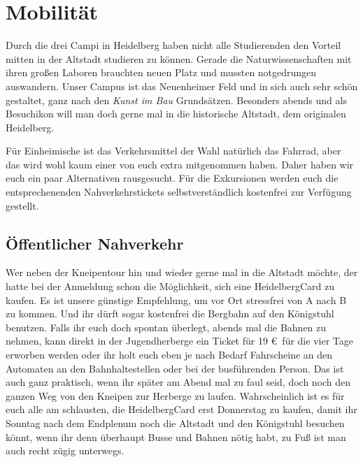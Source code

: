 
\section{Mobilität}
Durch die drei Campi in Heidelberg haben nicht alle Studierenden den Vorteil mitten in der Altstadt studieren zu können. Gerade die Naturwissenschaften mit ihren großen Laboren brauchten neuen Platz und mussten notgedrungen \glqq auswandern\grqq. Unser Campus ist das Neuenheimer Feld und in sich auch sehr schön gestaltet, ganz nach den \textit{Kunst im Bau} Grundsätzen. Besonders abends und als Besuchikon will man doch gerne mal in die historische Altstadt, dem originalen Heidelberg.

Für Einheimische ist das Verkehrsmittel der Wahl natürlich das Fahrrad, aber das wird wohl kaum einer von euch extra mitgenommen haben. Daher haben wir euch ein paar Alternativen  rausgesucht.
Für die Exkursionen werden euch die entsprechenenden Nahverkehrstickets selbstverständlich kostenfrei zur Verfügung gestellt.

\subsection{Öffentlicher Nahverkehr}
Wer neben der Kneipentour hin und wieder gerne mal in die Altstadt möchte, der hatte bei     der Anmeldung schon die Möglichkeit, sich eine HeidelbergCard zu kaufen. Es ist unsere günstige Empfehlung, um vor Ort stressfrei von A nach B zu kommen. Und ihr dürft sogar kostenfrei die Bergbahn auf den Königstuhl benutzen. Falls ihr euch doch spontan überlegt, abends mal die Bahnen zu nehmen, kann direkt in der Jugendherberge ein Ticket für 19 \euro\ für die vier Tage erworben werden oder ihr holt euch eben je nach Bedarf Fahrscheine an den Automaten an den Bahnhaltestellen oder bei der busführenden Person. Das ist auch ganz praktisch, wenn ihr später am Abend mal zu faul seid, doch noch den ganzen Weg von den Kneipen zur Herberge zu laufen. Wahrscheinlich ist es für euch alle am schlausten, die HeidelbergCard erst Donnerstag zu kaufen, damit ihr Sonntag nach dem Endplenum noch die Altstadt und den Königstuhl besuchen könnt, wenn ihr denn überhaupt Busse und Bahnen nötig habt, zu Fuß ist man auch recht zügig unterwegs.

